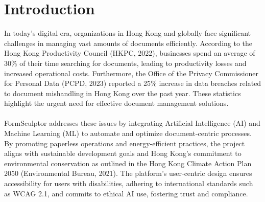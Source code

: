 \section{Introduction}

In today's digital era, organizations in Hong Kong and globally face significant challenges in managing vast amounts of documents efficiently. According to the Hong Kong Productivity Council (HKPC, 2022), businesses spend an average of 30\% of their time searching for documents, leading to productivity losses and increased operational costs. Furthermore, the Office of the Privacy Commissioner for Personal Data (PCPD, 2023) reported a 25\% increase in data breaches related to document mishandling in Hong Kong over the past year. These statistics highlight the urgent need for effective document management solutions.
\\
\\
FormSculptor addresses these issues by integrating Artificial Intelligence (AI) and Machine Learning (ML) to automate and optimize document-centric processes. By promoting paperless operations and energy-efficient practices, the project aligns with sustainable development goals and Hong Kong's commitment to environmental conservation as outlined in the Hong Kong Climate Action Plan 2050 (Environmental Bureau, 2021). The platform's user-centric design ensures accessibility for users with disabilities, adhering to international standards such as WCAG 2.1, and commits to ethical AI use, fostering trust and compliance.